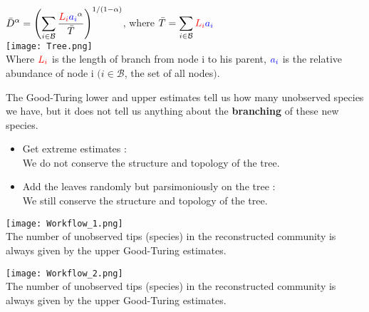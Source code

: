 \documentclass[10pt]{beamer}
\begin{document}
\begin{frame}
	\begin{center}
	 $ \displaystyle \bar{D}^{\alpha} =\left( \sum_{i \in \mathcal{B}} \dfrac{ \mathbin{\textcolor{red}{L_i}} \mathbin{\textcolor{blue}{a_i}}^{\alpha}}{\bar{T}} \right)^{1/(1-\alpha)} $, where $\displaystyle \bar{T}= \sum_{i \in \mathcal{B}} \mathbin{\textcolor{red}{L_i}} \mathbin{\textcolor{blue}{a_i}}$\\
       \texttt{[image: Tree.png]}\\
       Where $\mathbin{\textcolor{red}{L_i}}$ is the length of branch from node i to his parent, $ \mathbin{\textcolor{blue}{a_i}}$ is the relative abundance of node i $( i \in \mathcal{B}$, the set of all nodes$)$.
	\end{center}
\end{frame}




\begin{frame}
The Good-Turing lower and upper estimates tell us how many unobserved species we have, but it does not tell us anything about the \textbf{branching} of these new species.
\begin{itemize}
\item Get extreme estimates : \\
	We do not conserve the structure and topology of the tree.
\item Add the leaves randomly but parsimoniously on the tree : \\
	We still conserve the structure and topology of the tree.
\end{itemize}

\end{frame}


\begin{frame}
	\begin{center}
       \texttt{[image: Workflow\_1.png]}\\
              The number of unobserved tips (species) in the reconstructed community is always given by the upper Good-Turing estimates.
	\end{center}
\end{frame}

\begin{frame}
	\begin{center}
       \texttt{[image: Workflow\_2.png]}\\
       The number of unobserved tips (species) in the reconstructed community is always given by the upper Good-Turing estimates.
	\end{center}
\end{frame}
\end{document}
